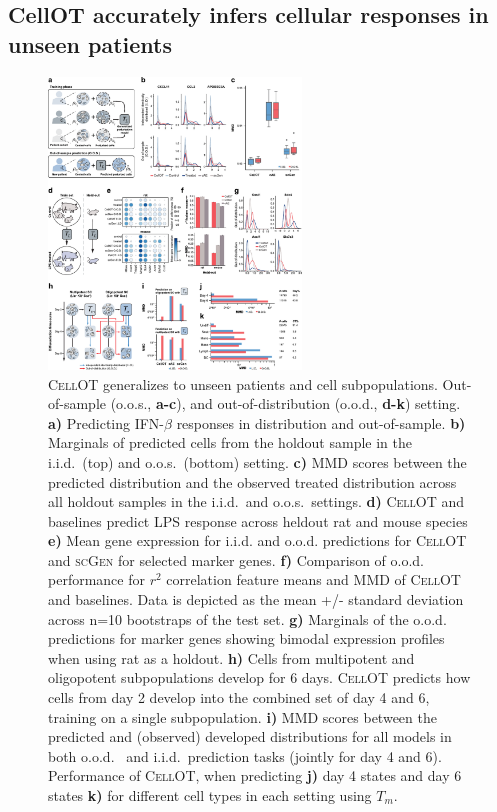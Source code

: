 \subsection{CellOT accurately infers cellular responses in unseen patients}

\begin{figure}
  \begin{center}
    \includegraphics[width=0.6\textwidth]{figures/cellot-methods/Bunne_Main_Fig4.pdf}
  \end{center}
  \caption{
  \textsc{CellOT} generalizes to unseen patients and cell subpopulations.
  Out-of-sample (o.o.s., \textbf{a-c}), and out-of-distribution (o.o.d., \textbf{d-k}) setting.
  \textbf{a)} Predicting IFN-$\beta$ responses in distribution and out-of-sample. 
  \textbf{b)} Marginals of predicted cells from the holdout sample in the i.i.d.~(top) and o.o.s.~(bottom) setting. 
  \textbf{c)} MMD scores between the predicted distribution and the observed treated distribution across all holdout samples in the i.i.d.~and o.o.s.~settings.
  \textbf{d)} \textsc{CellOT} and baselines predict LPS response across heldout rat and mouse species
  \textbf{e)} Mean gene expression for i.i.d. and o.o.d. predictions for \textsc{CellOT} and \textsc{scGen} for selected marker genes.
  \textbf{f)} Comparison of o.o.d. performance for $r^2$ correlation feature means and MMD of \textsc{CellOT} and baselines. Data is depicted as the mean +/- standard deviation across n=10 bootstraps of the test set.
  \textbf{g)} Marginals of the o.o.d. predictions for marker genes showing bimodal expression profiles when using rat as a holdout.
    \textbf{h)} Cells from multipotent and oligopotent subpopulations develop for 6 days. \textsc{CellOT} predicts how cells from day 2 develop into the combined set of day 4 and 6, training on a single subpopulation.
    \textbf{i)} MMD scores between the predicted and (observed) developed distributions for all models in both o.o.d.~ and i.i.d.~prediction tasks (jointly for day 4 and 6). Performance of \textsc{CellOT}, when predicting \textbf{j)} day 4 states and day 6 states \textbf{k)} for different cell types in each setting using $T_m$.}
  \label{fig:cellot-main-ood}
\end{figure}



